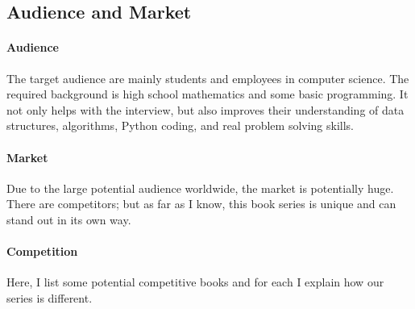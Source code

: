 \documentclass[12pt]{article}
\begin{document}
\subsection{Audience and Market}
\paragraph{Audience} The target audience are mainly students and employees in computer science. The required background is high school mathematics and some basic programming. 
It not only helps with the interview, but also improves their understanding of data structures, algorithms, Python coding, and real problem solving skills. 

\paragraph{Market} Due to the large potential audience worldwide, the market is potentially huge. There are competitors; but as far as I know, this book series is unique and can stand out in its own way. 

\paragraph{Competition} Here, I list some potential competitive books and for each I explain how our series is different. 
\end{document}
